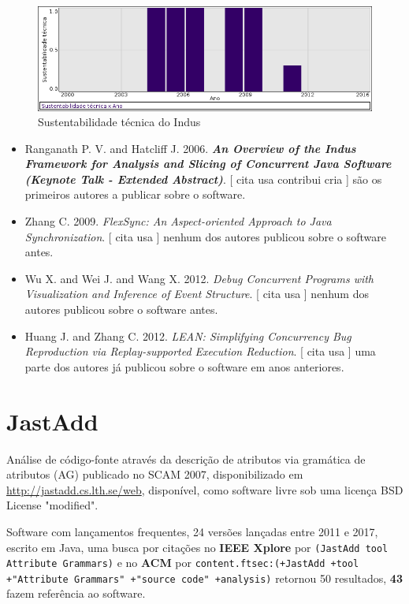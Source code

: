 \begin{figure}[h]
  \center
  \includegraphics[scale=0.50]{imagens/softwares-charts/indus.png}
  \caption{Sustentabilidade técnica do Indus}
\end{figure}


\begin{itemize}
\item Ranganath P. V. and Hatcliff J.
      2006.
        \textbf{\textit{ An Overview of the Indus Framework for Analysis and Slicing of Concurrent Java Software (Keynote Talk - Extended Abstract)}}.
      [
          cita
          usa
          contribui
          cria
      ]
são os primeiros autores a publicar sobre o software.
\item Zhang C.
      2009.
        \textit{ FlexSync: An Aspect-oriented Approach to Java Synchronization}.
      [
          cita
          usa
      ]
nenhum dos autores publicou sobre o software antes.
\item Wu X. and Wei J. and Wang X.
      2012.
        \textit{ Debug Concurrent Programs with Visualization and Inference of Event Structure}.
      [
          cita
          usa
      ]
nenhum dos autores publicou sobre o software antes.
\item Huang J. and Zhang C.
      2012.
        \textit{ LEAN: Simplifying Concurrency Bug Reproduction via Replay-supported Execution Reduction}.
      [
          cita
          usa
      ]
uma parte dos autores já publicou sobre o software em anos anteriores.
\end{itemize}
\section{JastAdd}

Análise de código-fonte através da descrição de atributos via gramática de atributos (AG)
publicado no SCAM 2007,
disponibilizado em \url{http://jastadd.cs.lth.se/web},
disponível,
como software livre
sob uma licença BSD License "modified".

Software com lançamentos frequentes,
24 versões lançadas
entre 2011 e 2017,
escrito em Java,
uma busca por citações no {\bf IEEE Xplore} por
\texttt{(JastAdd tool Attribute Grammars)}
e no {\bf ACM} por
\texttt{content.ftsec:(+JastAdd +tool +"Attribute Grammars" +"source code" +analysis)}
retornou
50 resultados,
{\bf 43} fazem referência ao software.



